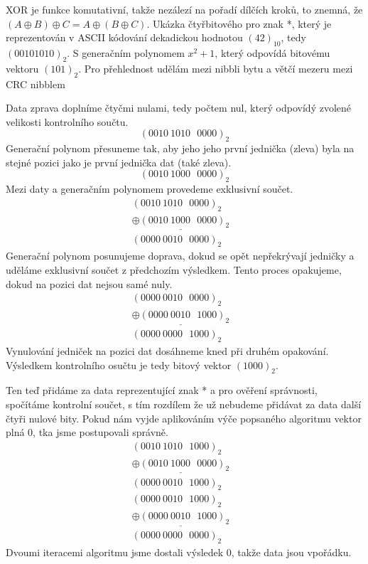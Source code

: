  XOR je funkce komutativní, takže nezálezí na pořadí dílčích kroků, to znemná, že $(A \oplus B) \oplus C = A \oplus (B \oplus C)$.
\newline\newline
Ukázka čtyřbitového  pro znak *, který je reprezentován v ASCII kódování dekadickou hodnotou $(42)_{10}$, tedy $(00101010)_2$. S generačním polynomem $x^2+1$, který odpovídá bitovému vektoru $(101)_2$. Pro přehlednost udělám mezi nibbli bytu a větčí mezeru mezi CRC nibblem

Data zprava doplníme čtyčmi nulami, tedy počtem nul, který odpovídý zvolené velikosti kontrolního součtu.
$$ (0010~1010~~~0000)_2 $$
Generační polynom přesuneme tak, aby jeho jeho první jednička (zleva) byla na stejné pozici jako je první jednička dat (také zleva).
$$ (0010~1000~~~0000)_2 $$
Mezi daty a generačním polynomem provedeme exklusivní součet.
\begin{eqnarray}
    (0010~1010~~~0000)_2  & \nonumber\\\underline{\oplus
    (0010~1000~~~0000)_2} & \nonumber\\
    (0000~0010~~~0000)_2  & \nonumber
\end{eqnarray}
Generační polynom posunujeme doprava, dokud se opět nepřekrývají jedničky a uděláme exklusivní součet z předchozím výsledkem. Tento proces opakujeme, dokud na pozici dat nejsou samé nuly.
\begin{eqnarray}
    (0000~0010~~~0000)_2  & \nonumber\\\underline{\oplus
    (0000~0010~~~1000)_2} & \nonumber\\
    (0000~0000~~~1000)_2  & \nonumber
\end{eqnarray}
Vynulování jedniček na pozici dat dosáhneme kned při druhém opakování. Výsledkem kontrolního osučtu je tedy bitový vektor $(1000)_2$.

Ten teď přidáme za data reprezentující znak * a pro ověření správnosti, spočítáme kontrolní součet, s tím rozdílem že už nebudeme přidávat za data další čtyři nulové bity. Pokud nám vyjde aplikováním výče popsaného algoritmu vektor plná 0, tka jsme postupovali správně.
\begin{eqnarray}
    (0010~1010~~~1000)_2  & \nonumber\\\underline{\oplus
    (0010~1000~~~0000)_2} & \nonumber\\
    (0000~0010~~~1000)_2  & \nonumber
\end{eqnarray}
\begin{eqnarray}
    (0000~0010~~~1000)_2  & \nonumber\\\underline{\oplus
    (0000~0010~~~1000)_2} & \nonumber\\
    (0000~0000~~~0000)_2  & \nonumber
\end{eqnarray}
Dvoumi iteracemi algoritmu jsme dostali výsledek 0, takže data jsou vpořádku.
